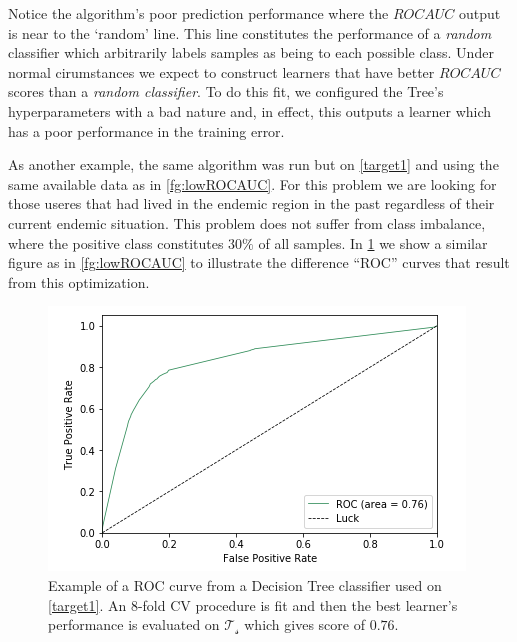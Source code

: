 Notice the algorithm's poor prediction performance where the $ROC AUC$ output is near to the `random' line.
This line constitutes the performance of a \textit{random} classifier which arbitrarily labels samples as being to each possible class.
Under normal cirumstances we expect to construct learners that have better $ROC AUC$ scores than a \textit{random classifier}.
To do this fit, we configured the Tree's hyperparameters with a bad nature and, in effect, this outputs a learner which has a poor performance in the training error.


As another example, the same algorithm was run but on \cref{target1} and using the same available data as in \cref{fg:lowROCAUC}.
For this problem we are looking for those useres that had lived in the endemic region in the past regardless of their current endemic situation.
This problem does not suffer from class imbalance, where the positive class constitutes $30\%$ of all samples.
In \cref{fg:highROCAUC} we show a similar figure as in \cref{fg:lowROCAUC} to illustrate the difference ``ROC'' curves that result from this optimization.

\begin{figure}[h!]
\begin{center}
\includegraphics[width=1\columnwidth]{figures/figure-highROCAUC/figure-highROCAUC}
\caption{Example of a ROC curve from a Decision Tree classifier used on \cref{target1}. An 8-fold CV procedure is fit and then the best learner's performance is evaluated on $\mathcal{T_s}$ which gives score of $0.76$.}
\label{fg:highROCAUC}
\end{center}
\end{figure}

